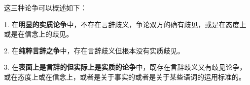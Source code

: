 这三种论争可以概述如下：

1. 在\textbf{明显的实质论争}中，不存在言辞歧义，争论双方的确有歧见，或是在态度上或是在信念上的歧见。

2. 在\textbf{纯粹言辞之争}中，存在言辞歧义但根本没有实质歧见。

3. 在\textbf{表面上是言辞的但实际上是实质的论争}中，既存在言辞歧义又有歧见论争，或在态度上或在信念上，或者是关于事实的或者是关于某些语词的运用标准的。

